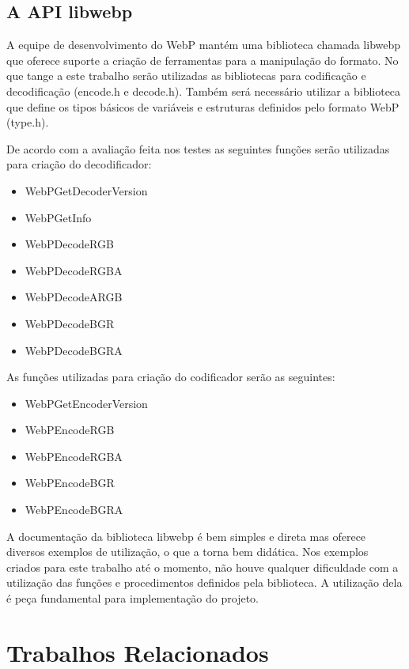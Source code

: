 \documentclass[espaco=simples,appendix=Name]{abnt}
\begin{document}
\begin{description}
\section{A API libwebp}

\item \noindent
A equipe de desenvolvimento do WebP mantém uma biblioteca chamada libwebp que oferece suporte a criação de ferramentas para a manipulação do formato. No que tange a este trabalho serão utilizadas as bibliotecas para codificação e decodificação (encode.h e decode.h). Também será necessário utilizar a biblioteca que define os tipos básicos de variáveis e estruturas definidos pelo formato WebP (type.h).

De acordo com a avaliação feita nos testes as seguintes funções serão utilizadas para criação do decodificador:

\begin{itemize}
	\item WebPGetDecoderVersion
	\item WebPGetInfo
	\item WebPDecodeRGB
	\item WebPDecodeRGBA
	\item WebPDecodeARGB
	\item WebPDecodeBGR
	\item WebPDecodeBGRA
\end{itemize}

As funções utilizadas para criação do codificador serão as seguintes:

\begin{itemize}
	\item WebPGetEncoderVersion
	\item WebPEncodeRGB
	\item WebPEncodeRGBA
	\item WebPEncodeBGR
	\item WebPEncodeBGRA
\end{itemize}

A documentação da biblioteca libwebp é bem simples e direta mas oferece diversos exemplos de utilização, o que a torna bem didática. Nos exemplos criados para este trabalho até o momento, não houve qualquer dificuldade com a utilização das funções e procedimentos definidos pela biblioteca. A utilização dela é peça fundamental para implementação do projeto.

\end{description}

\chapter{Trabalhos Relacionados}
\end{document}
